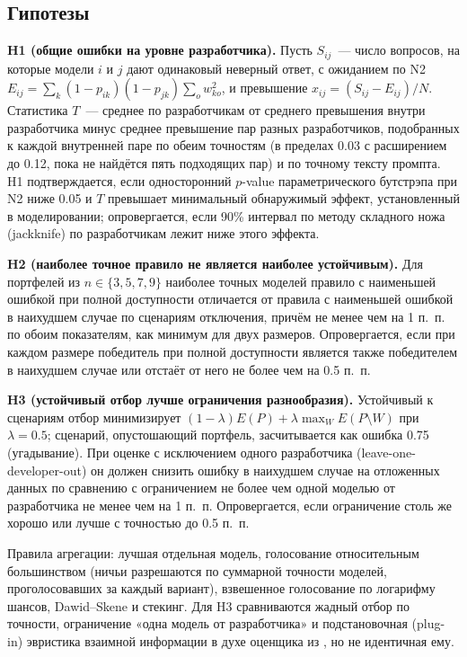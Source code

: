 \documentclass[preprint,12pt,authoryear]{elsarticle}
\begin{document}
\subsection{Гипотезы}
\textbf{H1 (общие ошибки на уровне разработчика).} Пусть $S_{ij}$~--- число вопросов, на которые модели $i$ и $j$ дают одинаковый неверный ответ, с ожиданием по N2 $E_{ij} = \sum_k (1-p_{ik})(1-p_{jk}) \sum_o w_{ko}^2$, и превышение $x_{ij} = (S_{ij}-E_{ij})/N$. Статистика $T$~--- среднее по разработчикам от среднего превышения внутри разработчика минус среднее превышение пар разных разработчиков, подобранных к каждой внутренней паре по обеим точностям (в пределах 0.03 с расширением до 0.12, пока не найдётся пять подходящих пар) и по точному тексту промпта. H1 подтверждается, если односторонний $p$-value параметрического бутстрэпа при N2 ниже 0.05 и $T$ превышает минимальный обнаружимый эффект, установленный в моделировании; опровергается, если 90\% интервал по методу складного ножа (jackknife) по разработчикам лежит ниже этого эффекта.

\textbf{H2 (наиболее точное правило не является наиболее устойчивым).} Для портфелей из $n \in \{3,5,7,9\}$ наиболее точных моделей правило с наименьшей ошибкой при полной доступности отличается от правила с наименьшей ошибкой в наихудшем случае по сценариям отключения, причём не менее чем на 1 п.~п. по обоим показателям, как минимум для двух размеров. Опровергается, если при каждом размере победитель при полной доступности является также победителем в наихудшем случае или отстаёт от него не более чем на 0.5 п.~п.

\textbf{H3 (устойчивый отбор лучше ограничения разнообразия).} Устойчивый к сценариям отбор минимизирует $(1-\lambda)E(P) + \lambda \max_W E(P\setminus W)$ при $\lambda = 0.5$; сценарий, опустошающий портфель, засчитывается как ошибка 0.75 (угадывание). При оценке с исключением одного разработчика (leave-one-developer-out) он должен снизить ошибку в наихудшем случае на отложенных данных по сравнению с ограничением не более чем одной моделью от разработчика не менее чем на 1 п.~п. Опровергается, если ограничение столь же хорошо или лучше с точностью до 0.5 п.~п.

Правила агрегации: лучшая отдельная модель, голосование относительным большинством (ничьи разрешаются по суммарной точности моделей, проголосовавших за каждый вариант), взвешенное голосование по логарифму шансов, Dawid--Skene \citep{dawidskene1979} и стекинг. Для H3 сравниваются жадный отбор по точности, ограничение «одна модель от разработчика» и подстановочная (plug-in) эвристика взаимной информации в духе оценщика из \citet{turkmen2026}, но не идентичная ему.
\end{document}
